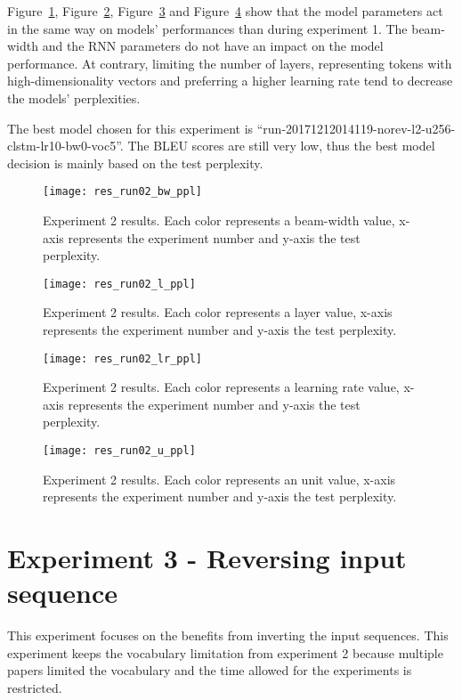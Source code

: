 Figure~\ref{fig:res_run02_bw_ppl}, Figure~\ref{fig:res_run02_l_ppl}, Figure~\ref{fig:res_run02_lr_ppl} and Figure~\ref{fig:res_run02_u_ppl} show that the model parameters act in the same way on models' performances than during experiment 1. The beam-width and the RNN parameters do not have an impact on the model performance. At contrary, limiting the number of layers, representing tokens with high-dimensionality vectors and preferring a higher learning rate tend to decrease the models' perplexities.

The best model chosen for this experiment is ``run-20171212014119-norev-l2-u256-clstm-lr10-bw0-voc5''. The BLEU scores are still very low, thus the best model decision is mainly based on the test perplexity.

\begin{landscape}
\begin{figure}
    \centering
    \texttt{[image: res\_run02\_bw\_ppl]}
    \decoRule
    \caption[Results experiment 2 BW-PPL]{Experiment 2 results. Each color represents a beam-width value, x-axis represents the experiment number and y-axis the test perplexity.}
    \label{fig:res_run02_bw_ppl}
\end{figure}
\begin{figure}
    \centering
    \texttt{[image: res\_run02\_l\_ppl]}
    \decoRule
    \caption[Results experiment 2 L-PPL]{Experiment 2 results. Each color represents a layer value, x-axis represents the experiment number and y-axis the test perplexity.}
    \label{fig:res_run02_l_ppl}
\end{figure}
\begin{figure}
    \centering
    \texttt{[image: res\_run02\_lr\_ppl]}
    \decoRule
    \caption[Results experiment 2 LR-PPL]{Experiment 2 results. Each color represents a learning rate value, x-axis represents the experiment number and y-axis the test perplexity.}
    \label{fig:res_run02_lr_ppl}
\end{figure}
\begin{figure}
    \centering
    \texttt{[image: res\_run02\_u\_ppl]}
    \decoRule
    \caption[Results experiment 2 U-PPL]{Experiment 2 results. Each color represents an unit value, x-axis represents the experiment number and y-axis the test perplexity.}
    \label{fig:res_run02_u_ppl}
\end{figure}
\end{landscape}


\section{Experiment 3 - Reversing input sequence}
This experiment focuses on the benefits from inverting the input sequences. This experiment keeps the vocabulary limitation from experiment 2 because multiple papers limited the vocabulary \citep{ecm-1704.01074,1503.02364,1506.05869,1703.01619,tensorflow.nmt} and the time allowed for the experiments is restricted.

